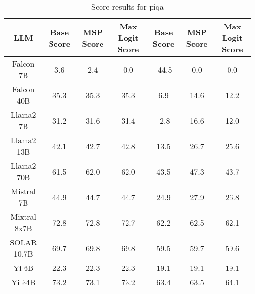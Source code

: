 \renewcommand\arraystretch{1.2}
\begin{table*}
\centering
\begin{tabular}{c|c|c|c|c|c|c}
LLM & Base Score & MSP Score & Max Logit Score & Base Score & MSP Score & Max Logit Score\\ \hline
Falcon 7B & 3.6 & 2.4 & 0.0 & -44.5 & 0.0 & 0.0\\
Falcon 40B & 35.3 & 35.3 & 35.3 & 6.9 & 14.6 & 12.2\\
Llama2 7B & 31.2 & 31.6 & 31.4 & -2.8 & 16.6 & 12.0\\
Llama2 13B & 42.1 & 42.7 & 42.8 & 13.5 & 26.7 & 25.6\\
Llama2 70B & 61.5 & 62.0 & 62.0 & 43.5 & 47.3 & 43.7\\
Mistral 7B & 44.9 & 44.7 & 44.7 & 24.9 & 27.9 & 26.8\\
Mixtral 8x7B & 72.8 & 72.8 & 72.7 & 62.2 & 62.5 & 62.1\\
SOLAR 10.7B & 69.7 & 69.8 & 69.8 & 59.5 & 59.7 & 59.6\\
Yi 6B & 22.3 & 22.3 & 22.3 & 19.1 & 19.1 & 19.1\\
Yi 34B & 73.2 & 73.1 & 73.2 & 63.4 & 63.5 & 64.1\\
\hline
\end{tabular}
\caption{Score results for piqa}
\end{table*}
\label{tab:piqa_score}
